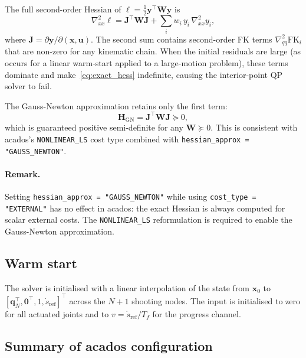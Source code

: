 \documentclass[11pt, a4paper]{article}
\newcommand{\qd}{\bm{q}}          %
\newcommand{\FK}{\mathrm{FK}}
\begin{document}
The full second-order Hessian of $\ell = \frac{1}{2}\bm{y}^\top \bm{W} \bm{y}$ is
\begin{equation}
  \nabla^2_{xx}\ell = \bm{J}^\top \bm{W} \bm{J}
  + \sum_{i} w_i\,y_i\,\nabla^2_{xx} y_i,
  \label{eq:exact_hess}
\end{equation}
where $\bm{J} = \partial\bm{y}/\partial(\bm{x},\bm{u})$.  The second sum contains
second-order FK terms $\nabla^2_{qq}\FK_i$ that are non-zero for any kinematic chain.
When the initial residuals are large (as occurs for a linear warm-start applied to a
large-motion problem), these terms dominate and make~\eqref{eq:exact_hess} indefinite,
causing the interior-point QP solver to fail.

The Gauss-Newton approximation retains only the first term:
\begin{equation}
  \bm{H}_\mathrm{GN} = \bm{J}^\top \bm{W} \bm{J} \succeq 0,
\end{equation}
which is guaranteed positive semi-definite for any $\bm{W} \succeq 0$. This is
consistent with acados's \texttt{NONLINEAR\_LS} cost type combined with
\texttt{hessian\_approx = "GAUSS\_NEWTON"}.

\paragraph{Remark.}
Setting \texttt{hessian\_approx = "GAUSS\_NEWTON"} while using \texttt{cost\_type =
"EXTERNAL"} has no effect in acados: the exact Hessian is always computed for scalar
external costs. The \texttt{NONLINEAR\_LS} reformulation is required to enable the
Gauss-Newton approximation.

\subsection{Warm start}

The solver is initialised with a linear interpolation of the state from
$\bm{x}_0$ to $[\qd_N^\top, \bm{0}^\top, 1, \dot{s}_\mathrm{ref}]^\top$ across the
$N+1$ shooting nodes. The input is initialised to zero for all actuated joints and to
$v = \dot{s}_\mathrm{ref}/T_f$ for the progress channel.

\subsection{Summary of acados configuration}
\end{document}
